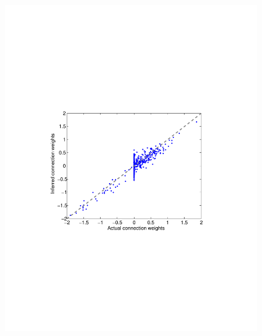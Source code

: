 \begin{figure}[h]
\centering
\begin{minipage}[c]{0.45\hsize}
\includegraphics[width=\hsize]{../figs/FigureA10_regular_sol}
\end{minipage}
\begin{minipage}[c]{0.45\hsize}

\end{minipage}
\end{figure}
